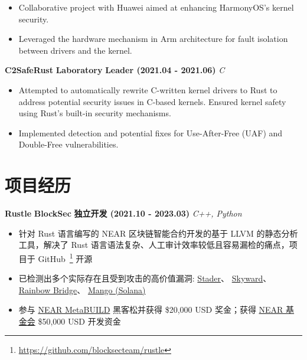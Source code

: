     \begin{itemize}
        \item Collaborative project with Huawei aimed at enhancing HarmonyOS's kernel security.
        \item Leveraged the hardware mechanism in Arm architecture for fault isolation between drivers and the kernel.
    \end{itemize}

    \ifdefined\qr\else

        \noindent \textbf{C2SafeRust} \textbar{} \textbf{Laboratory} \textbar{} \textbf{Leader (2021.04 - 2021.06)}
        \hfill \textsl{C}

        \begin{itemize}
            \item Attempted to automatically rewrite C-written kernel drivers to Rust to address potential security
                  issues in C-based kernels. Ensured kernel safety using Rust's built-in security mechanisms.
            \item Implemented detection and potential fixes for Use-After-Free (UAF) and Double-Free vulnerabilities.
        \end{itemize}

    \fi

\else

    \section*{项目经历}

    \noindent \textbf{Rustle} \textbar{} \textbf{BlockSec} \textbar{} \textbf{独立开发 (2021.10 - 2023.03)} \hfill
    \textsl{C++, Python}

    \begin{itemize}
        \item 针对 Rust 语言编写的 NEAR 区块链智能合约开发的基于 LLVM 的静态分析工具，解决了 Rust 语言语法复杂、人工审计效率较低且容易漏检的痛点，项目于 GitHub~\footnote{\url{https://github.com/blocksecteam/rustle}} 开源
        \item 已检测出多个实际存在且受到攻击的高价值漏洞:
              \href{https://blog.staderlabs.com/stader-near-incident-report-08-16-2022-afe077ffd549}{Stader}、
              \href{https://coinculture.com/au/business/skyward-finance-reportedly-suffers-3m-exploit-on-near-protocol/}{Skyward}、
              \href{https://cryptopotato.com/defi-crisis-averted-near-protocols-rainbow-bridge-attacker-loses-2-5-eth/}{Rainbow Bridge}、
              \href{https://blog.perp.fi/dissecting-the-mango-exploit-how-risk-is-mitigated-on-perp-v2-eccc91987c91}{Mango (Solana)}
        \item 参与 \href{https://devpost.com/software/rustle}{NEAR MetaBUILD} 黑客松并获得 \$20,000 USD 奖金；获得 \href{https://near.foundation}{NEAR 基金会} \$50,000 USD 开发资金
    \end{itemize}


